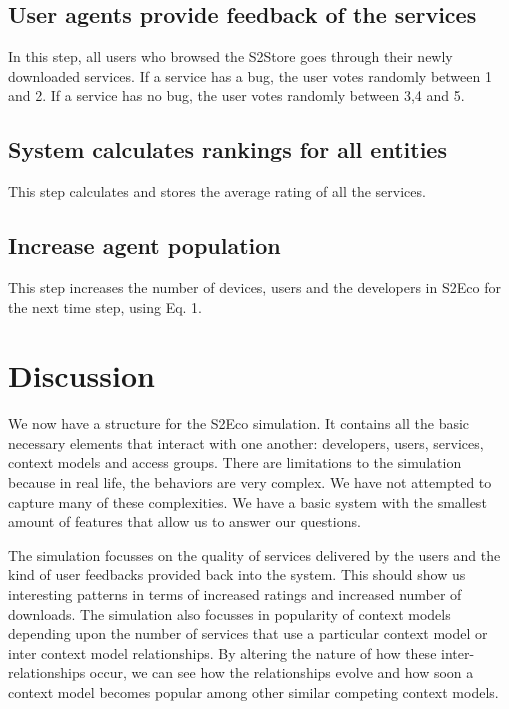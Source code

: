 \subsection{User agents provide feedback of the services}

In this step, all users who browsed the S2Store goes through their newly downloaded services. If a service has a bug, the user votes randomly between 1 and 2. If a service has no bug, the user votes randomly between 3,4 and 5.

\subsection{System calculates rankings for all entities}

This step calculates and stores the average rating of all the services.

\subsection{Increase agent population}

This step increases the number of devices, users and the developers in S2Eco for the next time step, using Eq. 1.

\section{Discussion}

We now have a structure for the S2Eco simulation. It contains all the basic necessary elements that interact with one another: developers, users, services, context models and access groups. There are limitations to the simulation because in real life, the behaviors are very complex. We have not attempted to capture many of these complexities. We have a basic system with the smallest amount of features that allow us to answer our questions.

The simulation focusses on the quality of services delivered by the users and the kind of user feedbacks provided back into the system. This should show us interesting patterns in terms of increased ratings and increased number of downloads. The simulation also focusses in popularity of context models depending upon the number of services that use a particular context model or inter context model relationships. By altering the nature of how these inter-relationships occur, we can see how the relationships evolve and how soon a context model becomes popular among other similar competing context models.